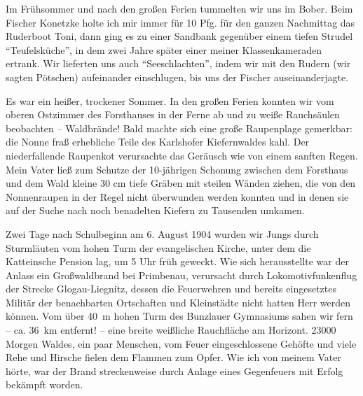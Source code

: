 Im Frühsommer und nach den großen Ferien tummelten wir uns im Bober. Beim Fischer Konetzke holte ich mir immer für 10 Pfg. für den ganzen Nachmittag das Ruderboot Toni, dann ging es zu einer Sandbank gegenüber einem tiefen Strudel \enquote{Teufelsküche}, in dem zwei Jahre später einer meiner Klassenkameraden ertrank. Wir lieferten uns auch \enquote{Seeschlachten}, indem wir mit den Rudern (wir sagten Pötschen) aufeinander einschlugen, bis uns der Fischer auseinanderjagte.

Es war ein heißer, trockener Sommer. In den großen Ferien konnten wir vom oberen Ostzimmer des Forsthauses in der Ferne ab und zu weiße Rauchsäulen beobachten -- Waldbrände! Bald machte sich eine große Raupenplage gemerkbar: die Nonne fraß erhebliche Teile des Karlshofer Kiefernwaldes kahl. Der niederfallende Raupenkot verursachte das Geräusch wie von einem sanften Regen. Mein Vater ließ zum Schutze der 10-jährigen Schonung zwischen dem Forsthaus und dem Wald kleine 30 cm tiefe Gräben mit steilen Wänden ziehen, die von den Nonnenraupen in der Regel nicht überwunden werden konnten und in denen sie auf der Suche nach noch benadelten Kiefern zu Tausenden umkamen.

Zwei Tage nach Schulbeginn am 6. August 1904 wurden wir Jungs durch Sturmläuten vom hohen Turm der evangelischen Kirche, unter dem die Katteinsche Pension lag, um 5 Uhr früh geweckt. Wie sich herausstellte war der Anlass ein Großwaldbrand bei Primbenau, verursacht durch Lokomotivfunkenflug der Strecke Glogau-Liegnitz, dessen die Feuerwehren und bereits eingesetztes Militär der benachbarten Ortschaften und Kleinstädte nicht hatten Herr werden können. Vom über 40~m hohen Turm des Bunzlauer Gymnasiums sahen wir fern -- ca. 36~km entfernt! -- eine breite weißliche Rauchfläche am Horizont. \num{23000} Morgen Waldes, ein paar Menschen, vom Feuer eingeschlossene Gehöfte und viele Rehe und Hirsche fielen dem Flammen zum Opfer. Wie ich von meinem Vater hörte, war der Brand streckenweise durch Anlage eines Gegenfeuers mit Erfolg bekämpft worden.

